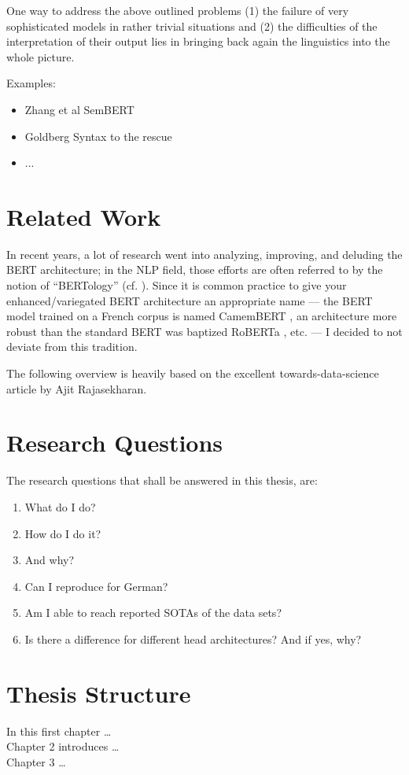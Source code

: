 One way to address the above outlined problems (1) the failure of very sophisticated models
in rather trivial situations and (2) the difficulties of the interpretation of their output
lies in bringing back again the linguistics into the whole picture.

Examples:

\begin{itemize}
	\item Zhang et al SemBERT
	\item Goldberg Syntax to the rescue
	\item ...
\end{itemize}


\section{Related Work}

In recent years, a lot of research went into analyzing, improving, and deluding the BERT architecture;
in the NLP field, those efforts are often referred to by the notion of ``BERTology'' (cf. \cite{rogers2020primer}).
Since it is common practice to give your enhanced/variegated BERT architecture an appropriate name --- the BERT model
trained on  a French corpus is named CamemBERT \cite{martin2019camembert}, an architecture more robust than the
standard BERT was baptized RoBERTa \cite{liu2019roberta}, etc. --- I decided to not deviate from this tradition.

The following overview is heavily based on the excellent towards-data-science article by Ajit Rajasekharan.


\section{Research Questions}

The research questions that shall be answered in this thesis, are:
\begin{enumerate}
 \item What do I do?
 \item How do I do it?
 \item And why?
	\item Can I reproduce \cite{zhang2019semantics} for German?
	\item Am I able to reach reported SOTAs of the data sets?
	\item Is there a difference for different head architectures? And if yes, why?
\end{enumerate}

\section{Thesis Structure}
In this first chapter \ldots\\
Chapter 2 introduces \ldots\\
Chapter 3 \ldots

